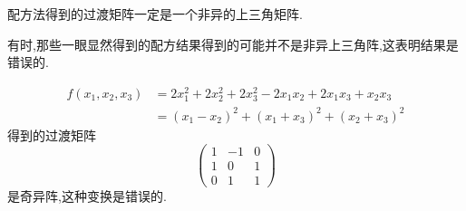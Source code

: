 \begin{red}
    \begin{remark}
        配方法得到的过渡矩阵一定是一个非异的上三角矩阵.

        有时,那些一眼显然得到的配方结果得到的可能并不是非异上三角阵,这表明结果是错误的.
    \end{remark}
\end{red}
\begin{brown}
    \begin{example}
        \begin{align*}
            f\left(
            x_1,x_2,x_3
            \right)&=2x_1^2+2x_2^2+2x_3^2-2x_1x_2+2x_1x_3+x_2x_3\\
            &=\left(
                x_1-x_2
            \right)^2+\left(
                x_1+x_3
            \right)^2+\left(
                x_2+x_3
            \right)^2
        \end{align*}得到的过渡矩阵\[
        \begin{pmatrix}
            1&-1&0\\
            1&0&1\\
            0&1&1
        \end{pmatrix}
        \]是奇异阵,这种变换是错误的.
    \end{example}
\end{brown}
